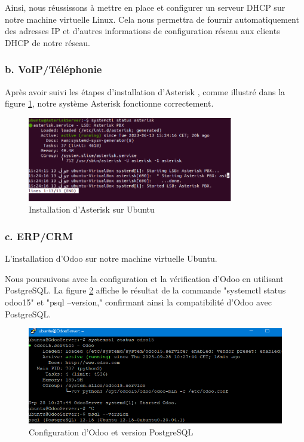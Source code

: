 Ainsi, nous réussissons  à mettre en place et configurer un serveur DHCP sur notre machine virtuelle Linux. Cela nous permettra de fournir automatiquement des adresses IP et d'autres informations de configuration réseau aux clients DHCP de notre réseau.

\subsubsection{b. VoIP/Téléphonie}

Après avoir suivi les étapes d'installation d'Asterisk \cite{asterisk-install-vegastack}, comme illustré dans la figure \ref{fig:asterisk-server1}, notre système Asterisk fonctionne correctement.

\begin{figure}[H]
    \centering
    \includegraphics[width=0.8\textwidth]{Images/AsteriskServer1.png}
    \caption{Installation d'Asterisk sur Ubuntu}
    \label{fig:asterisk-server1}
\end{figure}


\subsubsection{c. ERP/CRM}

L'installation d'Odoo \cite{odoo16-ubuntu-install} sur notre machine virtuelle Ubuntu.


Nous poursuivons avec la configuration et la vérification d'Odoo en utilisant PostgreSQL. La figure \ref{fig:psql-version} affiche le résultat de la commande "systemctl status odoo15" et "psql --version," confirmant ainsi la compatibilité d'Odoo avec PostgreSQL.

\begin{figure}[H]
\centering
\includegraphics[width=15cm]{Images/post104722.png}
\caption{Configuration d'Odoo et version PostgreSQL}
\label{fig:psql-version}
\end{figure}

